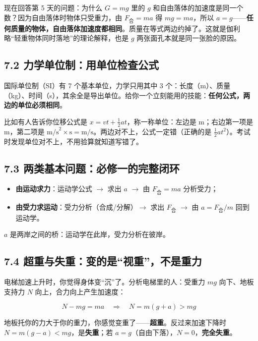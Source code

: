 \documentclass[UTF8,a4paper,11pt]{ctexart}
\begin{document}
现在回答第 5 天的问题：为什么 $G = mg$ 里的 $g$ 和自由落体的加速度是同一个数？因为自由落体时物体只受重力，由 $F_{\text{合}}=ma$ 得 $mg = ma$，所以 $a = g$——\textbf{任何质量的物体，自由落体加速度都相同}。质量在等式两边约掉了。这就是伽利略“轻重物体同时落地”的理论解释，也是 $g$ 两张面孔本就是同一张脸的原因。

\subsection*{7.2 力学单位制：用单位检查公式}

国际单位制（SI）有 7 个基本单位，力学只用其中 3 个：长度（m）、质量（kg）、时间（s），其余全是导出单位。给你一个立刻能用的技能：\textbf{任何公式，两边的单位必须相同}。

比如有人告诉你位移公式是 $x = vt + \frac{1}{2}at$，称一称单位：左边是 m；右边第一项是 m，第二项是 $\text{m/s}^2 \times \text{s} = \text{m/s}$。两边对不上，公式一定错（正确的是 $\frac{1}{2}at^2$）。考试时发现单位对不上，不用验算就知道写错了。

\subsection*{7.3 两类基本问题：必修一的完整闭环}

\begin{keyconcept}
\begin{itemize}
  \item \textbf{由运动求力}：运动学公式 $\rightarrow$ 求出 $a$ $\rightarrow$ 由 $F_{\text{合}}=ma$ 分析受力；
  \item \textbf{由受力求运动}：受力分析（合成/分解）$\rightarrow$ 求出 $F_{\text{合}}$ $\rightarrow$ 由 $a = F_{\text{合}}/m$ 回到运动学。
\end{itemize}
$a$ 是两岸之间的桥：运动学在此岸，受力分析在彼岸。
\end{keyconcept}

\subsection*{7.4 超重与失重：变的是“视重”，不是重力}

电梯加速上升时，你觉得身体变“沉”了。分析电梯里的人：受重力 $mg$ 向下、地板支持力 $N$ 向上，合力向上产生加速度：

\[
N - mg = ma \quad\Longrightarrow\quad N = m(g+a) > mg
\]

地板托你的力大于你的重力，你感觉变重了——\textbf{超重}。反过来加速下降时 $N = m(g-a) < mg$，是\textbf{失重}；若 $a=g$（自由下落），$N=0$，\textbf{完全失重}。
\end{document}
